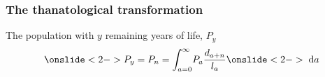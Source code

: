 \documentclass{beamer}
\newcommand{\dd}{\; \mathrm{d}}
\begin{document}


\begin{frame}
\frametitle{The thanatological transformation}
\begin{block}{The population with $y$ remaining years of life, $P_y$}
 \begin{equation}
   \onslide<2->{P_y = P_{n} = \int_{a=0}^\infty} P_a \frac{d_{a+n}}{l_a}
   \onslide<2->{\dd a}
 \end{equation}
 \end{block}
\end{frame}






\end{document}
